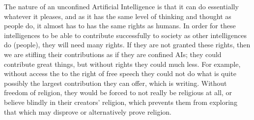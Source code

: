 The nature of an unconfined Artificial Intelligence is that it can do essentially whatever it pleases, and as it has the same level of thinking and thought as people do, it almost has to has the same rights as humans. In order for these intelligences to be able to contribute successfully to society as other intelligences do (people), they will need many rights. If they are not granted these rights, then we are stifling their contributions as if they are confined AIs; they could contribute great things, but without  rights they could much less. For example, without access the to the right of free speech they could not do what is quite possibly the largest contribution they can offer, which is writing. Without freedom of religion, they would be forced to not really be religious at all, or believe blindly in their creators' religion, which prevents them from exploring that which may disprove or alternatively prove religion.